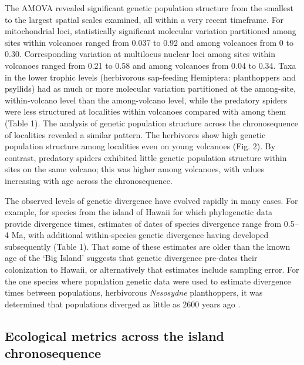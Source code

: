 The AMOVA revealed significant genetic population structure from the
smallest to the largest spatial scales examined, all within a very
recent timeframe. For mitochondrial loci, statistically significant
molecular variation partitioned among sites within volcanoes ranged
from 0.037 to 0.92 and among volcanoes from 0 to 0.30. Corresponding
variation at multilocus nuclear loci among sites within volcanoes
ranged from 0.21 to 0.58 and among volcanoes from 0.04 to 0.34. Taxa
in the lower trophic levels (herbivorous sap-feeding Hemiptera:
planthoppers and psyllids) had as much or more molecular variation
partitioned at the among-site, within-volcano level than the
among-volcano level, while the predatory spiders were less structured
at localities within volcanoes compared with among them (Table 1). The
analysis of genetic population structure across the chronosequence of
localities revealed a similar pattern. The herbivores show high
genetic population structure among localities even on young volcanoes
(Fig. 2). By contrast, predatory spiders exhibited little genetic
population structure within sites on the same volcano; this was higher
among volcanoes, with values increasing with age across the
chronosequence.

The observed levels of genetic divergence have evolved rapidly in many
cases. For example, for species from the island of Hawaii for which
phylogenetic data provide divergence times, estimates of dates of
species divergence range from 0.5--4 Ma, with additional
within-species genetic divergence having developed subsequently (Table
1). That some of these estimates are older than the known age of the
‘Big Island’ suggests that genetic divergence pre-dates their
colonization to Hawaii, or alternatively that estimates include
sampling error. For the one species where population genetic data were
used to estimate divergence times between populations, herbivorous
\textit{Nesosydne} planthoppers, it was determined that populations
diverged as little as 2600 years ago \citep[][Table 1]{goodman2012}.


\subsection{Ecological metrics across the island chronosequence}

